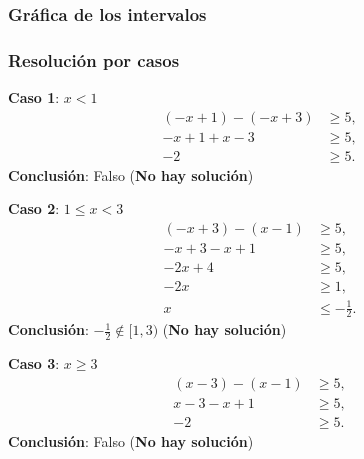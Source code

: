 \subsubsection*{Gr\'afica de los intervalos}

\begin{center}
    \end{center}
    

\subsubsection*{Resoluci\'on por casos}

\textbf{Caso 1}: $x < 1$
\begin{align*}
    (-x+1) - (-x+3) &\geq 5,\\
    -x+1 + x -3 &\geq 5,\\
    -2 &\geq 5.
\end{align*}
\textbf{Conclusi\'on}: Falso \quad (\textbf{No hay soluci\'on})

\textbf{Caso 2}: $1 \leq x < 3$
\begin{align*}
    (-x+3) - (x-1) &\geq 5,\\
    -x+3 - x +1 &\geq 5,\\
    -2x +4 &\geq 5,\\
    -2x &\geq 1,\\
    x &\leq -\frac{1}{2}.
\end{align*}
\textbf{Conclusi\'on}: $-\frac{1}{2} \notin [1,3)$ \quad (\textbf{No hay soluci\'on})

\textbf{Caso 3}: $x \geq 3$
\begin{align*}
    (x-3) - (x-1) &\geq 5,\\
    x-3 - x +1 &\geq 5,\\
    -2 &\geq 5.
\end{align*}
\textbf{Conclusi\'on}: Falso \quad (\textbf{No hay soluci\'on})

